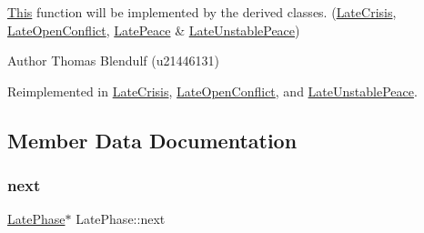 \mbox{\hyperlink{class_this}{This}} function will be implemented by the derived classes. (\mbox{\hyperlink{class_late_crisis}{Late\+Crisis}}, \mbox{\hyperlink{class_late_open_conflict}{Late\+Open\+Conflict}}, \mbox{\hyperlink{class_late_peace}{Late\+Peace}} \& \mbox{\hyperlink{class_late_unstable_peace}{Late\+Unstable\+Peace}}) 

\begin{DoxyAuthor}{Author}
Thomas Blendulf (u21446131) 
\end{DoxyAuthor}


Reimplemented in \mbox{\hyperlink{class_late_crisis_ae7e081694e9dd087a9b5e7ea489145bf}{Late\+Crisis}}, \mbox{\hyperlink{class_late_open_conflict_a12323179f9dda8bc9bd278bef208b698}{Late\+Open\+Conflict}}, and \mbox{\hyperlink{class_late_unstable_peace_a5cd4d50424017c5666386fc95e4bf0ae}{Late\+Unstable\+Peace}}.



\subsection{Member Data Documentation}
\mbox{\label{class_late_phase_a6a6cbc22ed0481a9ef3fb9c5998f16c3}} 
\subsubsection{\texorpdfstring{next}{next}}
{\footnotesize\ttfamily \mbox{\hyperlink{class_late_phase}{Late\+Phase}}$\ast$ Late\+Phase\+::next}

